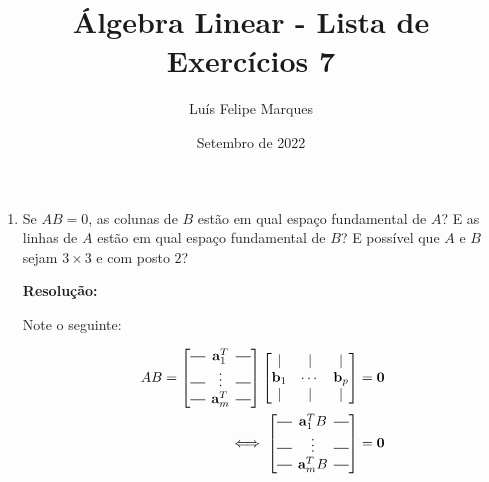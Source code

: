 \documentclass[leqno]{article}
\title{Álgebra Linear - Lista de Exercícios 7}
\author{Luís Felipe Marques}
\date{Setembro de 2022}
\newcommand*{\horzbar}{\rule[0.5ex]{2.5ex}{0.5pt}}
\begin{document}
 
\maketitle

\begin{enumerate}
    \item Se $AB = 0$, as colunas de $B$ estão em qual espaço fundamental de $A$? E as linhas de $A$ estão em qual espaço fundamental de $B$? E possível que $A$ e $B$ sejam $3\times3$ e com posto $2$?
    
    \textbf{Resolução:}
    
    Note o seguinte:

    \begin{align*}
        AB=\begin{bmatrix}
            \horzbar \hspace{-0.2cm} & \textbf{a}_1^T & \hspace{-0.2cm} \horzbar\\
            \horzbar \hspace{-0.2cm} & \vdots & \hspace{-0.2cm} \horzbar\\
            \horzbar \hspace{-0.2cm} & \textbf{a}_m^T & \hspace{-0.2cm} \horzbar\\
        \end{bmatrix}\begin{bmatrix}
            \vert & \vert & \vert\\
            \textbf{b}_1 & \cdots & \textbf{b}_p\\
            \vert & \vert & \vert\\
        \end{bmatrix}&=\textbf{0}\\
        \iff \begin{bmatrix}
            \horzbar \hspace{-0.2cm} & \textbf{a}_1^TB & \hspace{-0.2cm} \horzbar\\
            \horzbar \hspace{-0.2cm} & \vdots & \hspace{-0.2cm} \horzbar\\
            \horzbar \hspace{-0.2cm} & \textbf{a}_m^TB & \hspace{-0.2cm} \horzbar\\
        \end{bmatrix}&=\textbf{0}\\

\end{align*}
\end{enumerate}
\end{document}
